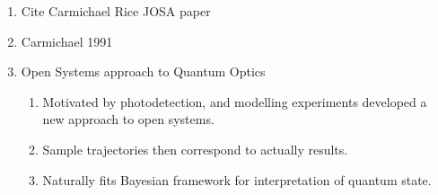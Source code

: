 \begin{enumerate}
\item Cite Carmichael Rice JOSA paper~\cite{Carmichael1989}
\item Carmichael 1991 ~\cite{Carmichael1991}
\item Open Systems approach to Quantum Optics\cite{Carmichael1993}
\begin{enumerate}
  \item Motivated by photodetection, and modelling experiments developed a new approach to open systems.  
  \item Sample trajectories then correspond to actually results.
  \item Naturally fits Bayesian framework for interpretation of quantum state.  
\end{enumerate}


\end{enumerate}
